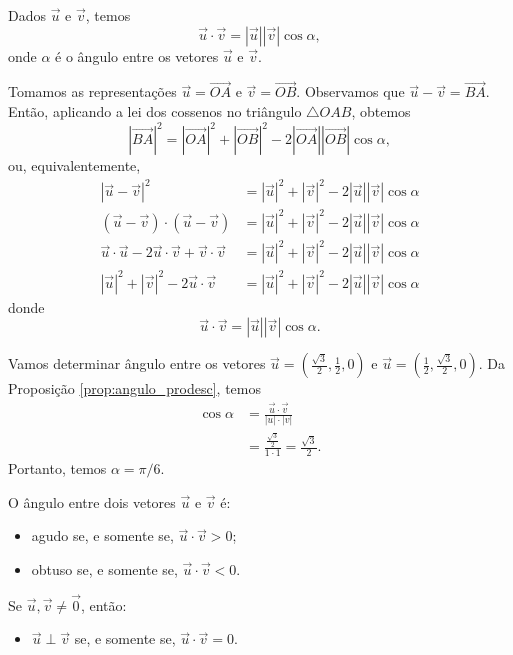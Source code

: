 \begin{prop}\label{prop:angulo_prodesc}
  Dados $\vec{u}$ e $\vec{v}$, temos
  \begin{equation}
    \vec{u}\cdot\vec{v}=|\vec{u}||\vec{v}|\cos\alpha,
  \end{equation}
  onde $\alpha$ é o ângulo entre os vetores $\vec{u}$ e $\vec{v}$.
\end{prop}
\begin{dem}
  Tomamos as representações $\vec{u} = \overrightarrow{OA}$ e $\vec{v} = \overrightarrow{OB}$. Observamos que $\vec{u}-\vec{v} = \overrightarrow{BA}$. Então, aplicando a lei dos cossenos no triângulo $\triangle OAB$, obtemos
  \begin{equation}
    |\overrightarrow{BA}|^2 = |\overrightarrow{OA}|^2 + |\overrightarrow{OB}|^2 - 2|\overrightarrow{OA}||\overrightarrow{OB}|\cos\alpha,
  \end{equation}
  ou, equivalentemente,
  \begin{align}
    |\vec{u}-\vec{v}|^2 &= |\vec{u}|^2+|\vec{v}|^2-2|\vec{u}||\vec{v}|\cos\alpha\\
    (\vec{u}-\vec{v})\cdot(\vec{u}-\vec{v}) &= |\vec{u}|^2+|\vec{v}|^2-2|\vec{u}||\vec{v}|\cos\alpha\\
    \vec{u}\cdot\vec{u}-2\vec{u}\cdot\vec{v}+\vec{v}\cdot\vec{v} &= |\vec{u}|^2+|\vec{v}|^2-2|\vec{u}||\vec{v}|\cos\alpha\\
    |\vec{u}|^2+|\vec{v}|^2-2\vec{u}\cdot\vec{v} &= |\vec{u}|^2+|\vec{v}|^2-2|\vec{u}||\vec{v}|\cos\alpha
  \end{align}
  donde
  \begin{equation}
    \vec{u}\cdot\vec{v} = |\vec{u}||\vec{v}|\cos\alpha.
  \end{equation}
\end{dem}

\begin{ex}
  Vamos determinar ângulo entre os vetores $\displaystyle \vec{u}=\left(\frac{\sqrt{3}}{2},\frac{1}{2},0\right)$ e $\displaystyle \vec{u}=\left(\frac{1}{2},\frac{\sqrt{3}}{2},0\right)$. Da Proposição \ref{prop:angulo_prodesc}, temos
  \begin{align}
    \cos\alpha &= \frac{\vec{u}\cdot\vec{v}}{|u|\cdot|v|}\\
               &= \frac{\frac{\sqrt{3}}{2}}{1\cdot 1} = \frac{\sqrt{3}}{2}.
  \end{align}
  Portanto, temos $\alpha = \pi/6$.
\end{ex}

\begin{obs}
  O ângulo entre dois vetores $\vec{u}$ e $\vec{v}$ é:
  \begin{itemize}
  \item agudo se, e somente se, $\vec{u}\cdot\vec{v} > 0$;
  \item obtuso se, e somente se, $\vec{u}\cdot\vec{v} < 0$.
  \end{itemize}
  Se $\vec{u},\vec{v}\neq\vec{0}$, então:
  \begin{itemize}
  \item $\vec{u}\perp\vec{v}$ se, e somente se, $\vec{u}\cdot\vec{v}=0$.
  \end{itemize}
\end{obs}

